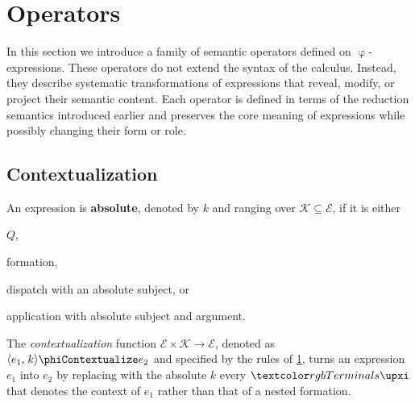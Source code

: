 
\section{Operators}\label{sec:operators}

In this section we introduce a family of semantic operators
  defined on \(\upvarphi\)-expressions.
These operators do not extend the syntax of the calculus.
Instead, they describe systematic transformations of expressions that reveal,
  modify, or project their semantic content.
Each operator is defined in terms of the reduction semantics introduced earlier
  and preserves the core meaning of expressions
  while possibly changing their form or role.

\subsection{Contextualization}\label{sec:contextualization}
\makeatletter
\protected@edef{}%
\makeatother
\label{r:contextualize}

\begin{definition}[Absolute]
An expression is \textbf{absolute},
  denoted by \(k\) and ranging over \(\mathcal{K} \subseteq \mathcal{E}\),
  if it is either
  \begin{inparaenum}[a)]
  \item $Q$,
  \item formation,
  \item dispatch with an absolute subject,
  or
  \item application with absolute subject and argument.
  \end{inparaenum}
\end{definition}

\begin{definition}[Contextualization]
The \emph{contextualization} function
  \(\mathcal{E} \times \mathcal{K} \to \mathcal{E}\),
  denoted as \(\phinoContextualize{e_1}{k}{e_2}\)
  and specified by the rules of \cref{fig:contextualization},
  turns an expression \(e_1\) into \(e_2\)
  by replacing with the absolute \(k\)
  every \(\phiTerminal{\upxi}\) that denotes the context of \(e_1\)
  rather than that of a nested formation.
\end{definition}

\begin{figure}
\begin{mdframed}
\centering
{}

\end{mdframed}
\label{fig:contextualization}
\end{figure}

